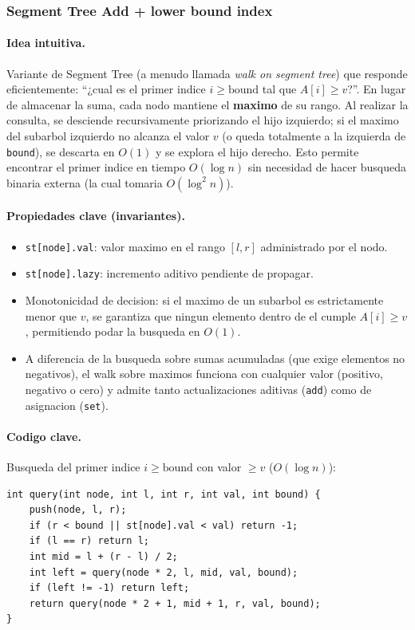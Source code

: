 \subsubsection{Segment Tree Add + lower bound index}

\paragraph{Idea intuitiva.}
Variante de Segment Tree (a menudo llamada \textit{walk on segment tree}) que responde eficientemente: ``¿cual es el primer indice $i \ge \text{bound}$ tal que $A[i] \ge v$?''. En lugar de almacenar la suma, cada nodo mantiene el \textbf{maximo} de su rango. Al realizar la consulta, se desciende recursivamente priorizando el hijo izquierdo; si el maximo del subarbol izquierdo no alcanza el valor $v$ (o queda totalmente a la izquierda de \texttt{bound}), se descarta en $O(1)$ y se explora el hijo derecho. Esto permite encontrar el primer indice en tiempo $O(\log n)$ sin necesidad de hacer busqueda binaria externa (la cual tomaria $O(\log^2 n)$).

\paragraph{Propiedades clave (invariantes).}
\begin{itemize}\setlength\itemsep{0pt}
	\item \texttt{st[node].val}: valor maximo en el rango $[l, r]$ administrado por el nodo.
	\item \texttt{st[node].lazy}: incremento aditivo pendiente de propagar.
	\item Monotonicidad de decision: si el maximo de un subarbol es estrictamente menor que $v$, se garantiza que ningun elemento dentro de el cumple $A[i] \ge v$, permitiendo podar la busqueda en $O(1)$.
	\item A diferencia de la busqueda sobre sumas acumuladas (que exige elementos no negativos), el walk sobre maximos funciona con cualquier valor (positivo, negativo o cero) y admite tanto actualizaciones aditivas (\texttt{add}) como de asignacion (\texttt{set}).
\end{itemize}

\paragraph{Codigo clave.}
Busqueda del primer indice $i \ge \text{bound}$ con valor $\ge v$ ($O(\log n)$):
\begin{verbatim}
int query(int node, int l, int r, int val, int bound) {
    push(node, l, r);
    if (r < bound || st[node].val < val) return -1;
    if (l == r) return l;
    int mid = l + (r - l) / 2;
    int left = query(node * 2, l, mid, val, bound);
    if (left != -1) return left;
    return query(node * 2 + 1, mid + 1, r, val, bound);
}
\end{verbatim}

